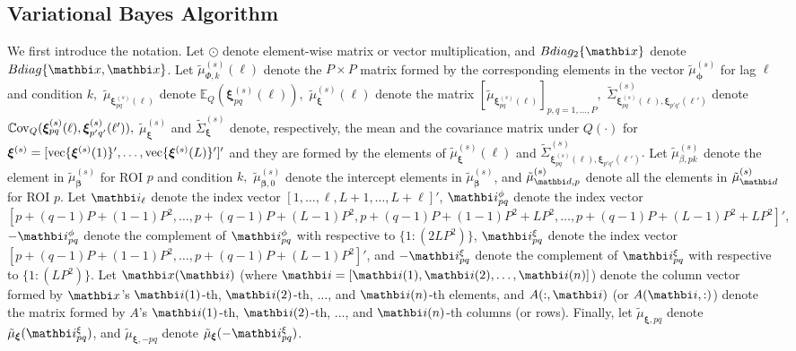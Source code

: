 \documentclass[12pt,titlepage,fleqn]{article}
\newcommand{\Cov}{\mathop{\rm {\mathbb C}ov}\nolimits}%
\newcommand{\E}{{\mathbb E}}
\newcommand{\1}{{\bm 1}}
\newcommand{\vx}{\mathbi x}
\newcommand{\vd}{\mathbi d}
\newcommand{\vi}{\mathbi i}
\newcommand{\vbeta}{\boldsymbol \beta}
\newcommand{\vphi}{\boldsymbol \phi}
\newcommand{\vxi}{\boldsymbol \xi}
\newcommand{\vmu}{\boldsymbol{\mu}}
\newcommand{\vpi}{\boldsymbol{\pi}}
\newcommand{\vecn}{\mbox{\rm vec}}
\newcommand{\s}{^{(s)}}
\begin{document}
{\color{blue}
\subsection*{Variational Bayes Algorithm}

We first introduce the notation. Let $\odot$ denote element-wise matrix or vector multiplication, and $Bdiag_2\{\vx\}$ denote $Bdiag\{\vx, \vx\}$. 
Let $\tilde{\mu}_{\Phi,k}\s(\ell)$ denote the $P\times P$ matrix formed by the corresponding elements in the vector $\tilde{\mu}_{\vphi}\s$ for lag $\ell$ and condition $k,$ 
$\tilde{\mu}_{\vxi_{pq}\s(\ell)}$ denote $\E_Q(\vxi_{pq}\s(\ell)),$ 
$\tilde{\mu}_{\vxi}\s(\ell)$ denote the matrix $[\tilde{\mu}_{\vxi_{pq}\s(\ell)}]_{p,q=1,\dots,P},$ 
$\tilde{\Sigma}_{\vxi_{pq}\s(\ell), \vxi_{p'q'}(\ell')}\s$ denote $\Cov_Q(\vxi_{pq}\s(\ell), 
\vxi_{p'q'}\s(\ell')),$ 
$\tilde{\mu}_{\vxi}\s$ and $\tilde{\Sigma}_{\vxi}\s$ denote, respectively, the mean and the covariance matrix under $Q(\cdot)$ for $\vxi\s=[\vecn\{{\vxi}\s(1)\}', \dots, \vecn\{{\vxi}\s(L)\}']'$ and they are 
formed by the elements of $\tilde{\mu}_{\vxi}\s(\ell)$ and $\tilde{\Sigma}_{\vxi_{pq}\s(\ell), 
\vxi_{p'q'}(\ell')}\s.$ Let $\tilde{\mu}_{\beta,pk}\s$ denote the element in $\tilde{\mu}_{\vbeta}\s$ for ROI $p$ and condition $k,$
$\tilde{\mu}_{\vbeta,0}\s$ denote the intercept elements in $\tilde{\mu}_{\vbeta}\s$,
and $\tilde{\mu}_{\vd,p}\s$ denote all the elements in $\tilde{\mu}_{\vd}\s$ for ROI $p.$ 
Let $\vi_{\ell}$ denote the index vector $[1,\dots,\ell, L+1, \dots, L+\ell]'$,
$\vi^{\phi}_{pq}$ denote the index vector $[p+(q-1)P+(1-1)P^2, \dots, p+(q-1)P+(L-1)P^2, p+(q-1)P+(1-1)P^2+ LP^2, \dots, p+(q-1)P+(L-1)P^2 + LP^2]',$ $-\vi^{\phi}_{pq}$ denote the complement of $\vi^{\phi}_{pq}$ with respective to $\{1:(2LP^2)\}$, 
$\vi^{\xi}_{pq}$ denote the index vector $[p+(q-1)P+(1-1)P^2, \dots, p+(q-1)P+(L-1)P^2]'$, and $-\vi^{\xi}_{pq}$ denote the complement of $\vi^{\xi}_{pq}$ with respective to $\{1:(LP^2)\}.$ Let
$\vx(\vi)$ (where $\vi=[\vi(1),\vi(2),\dots, \vi(n)]$) denote the column vector formed by $\vx$'s $\vi(1)$-th, $\vi(2)$-th, $\dots$, 
and $\vi(n)$-th elements,
and $A(:,\vi)$ (or $A(\vi,:)$) denote the matrix formed by $A$'s $\vi(1)$-th, $\vi(2)$-th, $\dots$, 
and $\vi(n)$-th columns (or rows). Finally, let
$\tilde{\mu}_{\vxi,{pq}}$ denote 
$\tilde{\mu}_{\vxi}(\vi^{\xi}_{pq})$, and $\tilde{\mu}_{\vxi,{-pq}}$ denote $\tilde{\mu}_{\vxi}(-\vi^{\xi}_{pq})$. 

}
\end{document}
